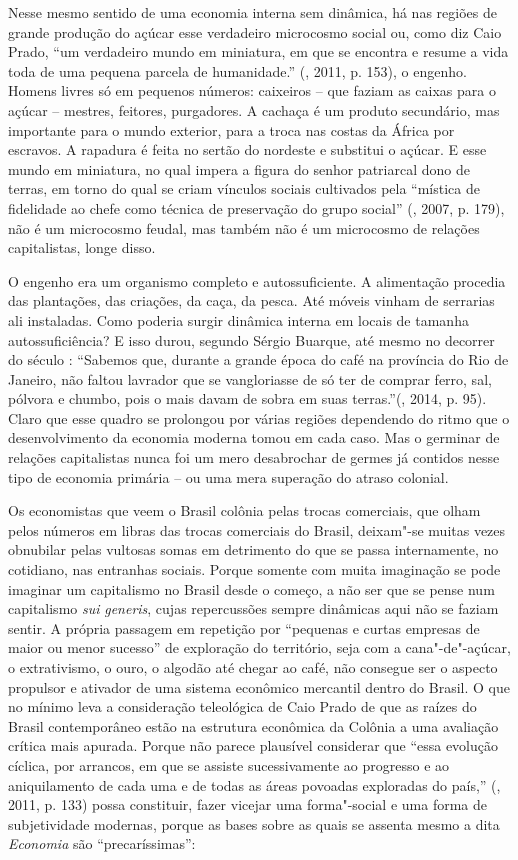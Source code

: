 Nesse mesmo sentido de uma economia interna sem dinâmica, há nas regiões
de grande produção do açúcar esse verdadeiro microcosmo social ou, como
diz Caio Prado, ``um verdadeiro mundo em miniatura, em que se encontra e
resume a vida toda de uma pequena parcela de humanidade.'' (,
2011, p. 153), o engenho. Homens livres só em pequenos números:
caixeiros -- que faziam as caixas para o açúcar -- mestres, feitores,
purgadores. A cachaça é um produto secundário, mas importante para o
mundo exterior, para a troca nas costas da África por escravos. A
rapadura é feita no sertão do nordeste e substitui o açúcar. E esse
mundo em miniatura, no qual impera a figura do senhor patriarcal dono de
terras, em torno do qual se criam vínculos sociais cultivados pela
``mística de fidelidade ao chefe como técnica de preservação do grupo
social'' (, 2007, p. 179), não é um microcosmo feudal, mas também
não é um microcosmo de relações capitalistas, longe disso.

O engenho era um organismo completo e autossuficiente. A alimentação
procedia das plantações, das criações, da caça, da pesca. Até móveis
vinham de serrarias ali instaladas. Como poderia surgir dinâmica interna
em locais de tamanha autossuficiência? E isso durou, segundo Sérgio
Buarque, até mesmo no decorrer do século : ``Sabemos que, durante a
grande época do café na província do Rio de Janeiro, não faltou lavrador
que se vangloriasse de só ter de comprar ferro, sal, pólvora e chumbo,
pois o mais davam de sobra em suas terras.''(, 2014, p. 95).
Claro que esse quadro se prolongou por várias regiões dependendo do
ritmo que o desenvolvimento da economia moderna tomou em cada caso. Mas
o germinar de relações capitalistas nunca foi um mero desabrochar de
germes já contidos nesse tipo de economia primária -- ou uma mera
superação do atraso colonial.

Os economistas que veem o Brasil colônia pelas trocas comerciais, que
olham pelos números em libras das trocas comerciais do Brasil, deixam"-se
muitas vezes obnubilar pelas vultosas somas em detrimento do que se
passa internamente, no cotidiano, nas entranhas sociais. Porque somente
com muita imaginação se pode imaginar um capitalismo no Brasil desde o
começo, a não ser que se pense num capitalismo \emph{sui}
\emph{generis}, cujas repercussões sempre dinâmicas aqui não se faziam
sentir. A própria passagem em repetição por ``pequenas e curtas empresas
de maior ou menor sucesso'' de exploração do território, seja com a
cana"-de"-açúcar, o extrativismo, o ouro, o algodão até chegar ao café,
não consegue ser o aspecto propulsor e ativador de uma sistema econômico
mercantil dentro do Brasil. O que no mínimo leva a consideração
teleológica de Caio Prado de que as raízes do Brasil contemporâneo estão
na estrutura econômica da Colônia a uma avaliação crítica mais apurada.
Porque não parece plausível considerar que ``essa evolução cíclica, por
arrancos, em que se assiste sucessivamente ao progresso e ao
aniquilamento de cada uma e de todas as áreas povoadas exploradas do
país,'' (, 2011, p. 133) possa constituir, fazer vicejar uma
forma"-social e uma forma de subjetividade modernas, porque as bases
sobre as quais se assenta mesmo a dita \emph{Economia} são
``precaríssimas'':

